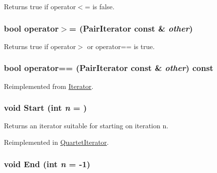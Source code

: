 Returns true if operator$<$= is false. \hypertarget{classJKBuilder_1_1PairIterator_a0064337d38b8f97d0367be2e9bd31d62}{
\subsubsection[{operator$>$=}]{\setlength{\rightskip}{0pt plus 5cm}bool operator$>$= ({\bf PairIterator} const \& {\em other})}}
\label{classJKBuilder_1_1PairIterator_a0064337d38b8f97d0367be2e9bd31d62}


Returns true if operator$>$ or operator== is true. \hypertarget{classJKBuilder_1_1PairIterator_a6b4e430066f478e5e400edd39ef93968}{
\subsubsection[{operator==}]{\setlength{\rightskip}{0pt plus 5cm}bool operator== ({\bf PairIterator} const \& {\em other}) const}}
\label{classJKBuilder_1_1PairIterator_a6b4e430066f478e5e400edd39ef93968}


Reimplemented from \hyperlink{classJKBuilder_1_1Iterator_a1ea001976a5bc8ae8dc365e2a912b59a}{Iterator}.\hypertarget{classJKBuilder_1_1Iterator_a34ca36a99b20ae3170babadaffe51ed2}{
\subsubsection[{Start}]{\setlength{\rightskip}{0pt plus 5cm}void Start (int {\em n} = {})}}
\label{classJKBuilder_1_1Iterator_a34ca36a99b20ae3170babadaffe51ed2}


Returns an iterator suitable for starting on iteration n. 

Reimplemented in \hyperlink{classJKBuilder_1_1QuartetIterator_a34ca36a99b20ae3170babadaffe51ed2}{QuartetIterator}.\hypertarget{classJKBuilder_1_1Iterator_a5f692b73d2e160450f4617bb75825e11}{
\subsubsection[{End}]{\setlength{\rightskip}{0pt plus 5cm}void End (int {\em n} = {\ttfamily -\/1})}}
\label{classJKBuilder_1_1Iterator_a5f692b73d2e160450f4617bb75825e11}


